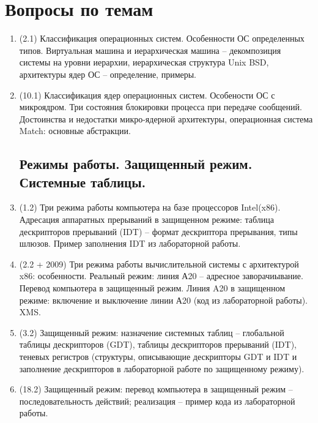 \documentclass[a4paper,14pt]{extreport}
\begin{document}
\chapter{Вопросы по темам}

\begin{enumerate}

\section{Операционные системы.\\Классификация ядер.}
    \item (2.1) Классификация операционных систем. Особенности ОС определенных
        типов.  Виртуальная машина и иерархическая машина -- декомпозиция
        системы на уровни иерархии, иерархическая структура Unix BSD,
        архитектуры ядер ОС -- определение, примеры.
    \item (10.1) Классификация ядер операционных систем. Особености ОС
        с микроядром. Три состояния блокировки процесса при передаче
        сообщений. Достоинства и недостатки микро-ядерной архитектуры,
        операционная  система Match: основные абстракции.

\section{Режимы работы. Защищенный режим. Системные таблицы.}
    \item (1.2) Три режима работы компьютера на базе процессоров Intel(x86).
        Адресация аппаратных прерываний в защищенном режиме: таблица
        дескрипторов прерываний (IDT) -- формат дескриптора прерывания,
        типы шлюзов. Пример заполнения IDT из лабораторной работы.
    \item (2.2 + 2009) Три режима работы вычислительной системы с
        архитектурой x86: особенности. Реальный режим: линия А20 --
        адресное заворачиывание. Перевод компьютера в защищенный режим.
        Линия A20 в защищенном режиме: включение и выключение линии А20
        (код из лабораторной работы). XMS.
    \item (3.2) Защищенный режим: назначение системных таблиц -- глобальной
        таблицы дескрипторов (GDT), таблицы дескрипторов прерываний (IDT),
        теневых регистров (структуры, описывающие дескрипторы GDT и IDT
        и заполнение дескрипторов в лабораторной работе по защищенному
        режиму).
    \item (18.2) Защищенный режим: перевод компьютера в защищенный режим --
        последовательность действий; реализация -- пример кода из лабораторной
        работы.


\end{enumerate}
\end{document}

